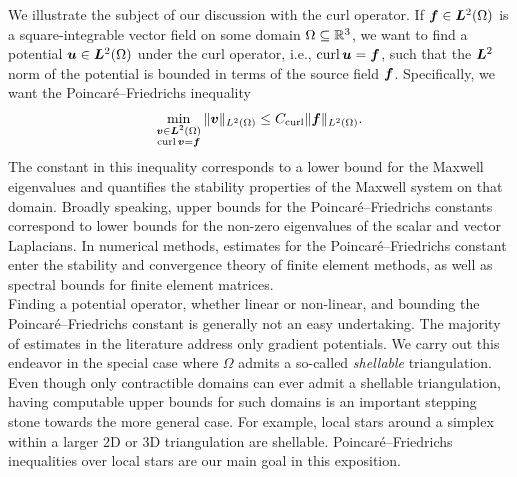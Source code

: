 \documentclass[10pt,letterpaper]{article}
\begin{document}
We illustrate the subject of our discussion with the curl operator. 
If $\bm{f} \in \bm{L}^{2}(\Omega)$ is a square-integrable vector field on some domain $\Omega \subseteq {\mathbb R}^3$, 
we want to find a potential $\bm{u} \in \bm{L}^2(\Omega)$ under the curl operator, i.e., $\operatorname{curl} \bm{u} = \bm{f}$, such that the $\bm{L}^2$ norm of the potential is bounded in terms of the source field $\bm{f}$. Specifically, we want the Poincar\'e--Friedrichs inequality %
\begin{align*}
    \min\limits_{ \substack{ \bm{v} \in \bm{L}^{2}(\Omega) \\ \operatorname{curl} \bm{v} = \bm{f} } } \| \bm{v} \|_{L^{2}(\Omega)}
    \leq 
    C_{\operatorname{curl}}
    \| \bm{f} \|_{L^{2}(\Omega)}
    .
\end{align*}
The constant in this inequality corresponds to a lower bound for the Maxwell eigenvalues and quantifies the stability properties of the Maxwell system on that domain. 
Broadly speaking, upper bounds for the Poincar\'e--Friedrichs constants correspond to lower bounds for the non-zero eigenvalues of the scalar and vector Laplacians.
In numerical methods, estimates for the Poincar\'e--Friedrichs constant enter the stability and convergence theory of finite element methods, as well as spectral bounds for finite element matrices. 
\\



Finding a potential operator, whether linear or non-linear, and bounding the Poincar\'e--Friedrichs constant is generally not an easy undertaking. 
The majority of estimates in the literature address only gradient potentials. 
We carry out this endeavor in the special case where $\Omega$ admits a so-called \emph{shellable} triangulation. 
Even though only contractible domains can ever admit a shellable triangulation, 
having computable upper bounds for such domains is an important stepping stone towards the more general case. 
For example, local stars around a simplex within a larger 2D or 3D triangulation are shellable.
Poincar\'e--Friedrichs inequalities over local stars are our main goal in this exposition. 
\\
\end{document}
